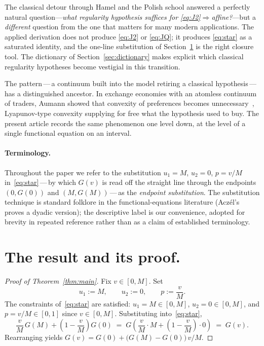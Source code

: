 \documentclass{article}
\theoremstyle{plain}
\theoremstyle{definition}
\begin{document}
The classical detour through Hamel and the Polish school answered a
perfectly natural question---\emph{what regularity hypothesis suffices
for \eqref{eq:J2}$\Rightarrow$affine?}---but a \emph{different}
question from the one that matters for many modern applications. The
applied derivation does not produce \eqref{eq:J2} or \eqref{eq:JQ};
it produces \eqref{eq:star} as a saturated identity, and the one-line
substitution of Section~\ref{sec:proof} is the right closure tool. The
dictionary of Section~\ref{sec:dictionary} makes explicit which classical
regularity hypotheses become vestigial in this transition.

The pattern\,---\,a continuum built into the model retiring a
classical hypothesis\,---\,has a distinguished ancestor. In exchange
economies with an atomless continuum of traders, Aumann showed that
convexity of preferences becomes unnecessary~\cite{Aumann1964},
Lyapunov-type convexity supplying for free what the hypothesis used to
buy. The present article records the same phenomenon one level down, at
the level of a single functional equation on an interval.

\paragraph{Terminology.}
Throughout the paper we refer to the substitution $u_1=M$, $u_2=0$,
$p=v/M$ in~\eqref{eq:star}\,---\,by which $G(v)$ is read off the straight
line through the endpoints $(0,G(0))$ and $(M,G(M))$\,---\,as the
\emph{endpoint substitution}. The substitution technique is standard
folklore in the functional-equations literature (Acz\'el's
\cite[\S2.1.4]{Aczel1966} proves a dyadic version); the descriptive
label is our convenience, adopted for brevity in repeated reference
rather than as a claim of established terminology.

\section{The result and its proof.}
\label{sec:proof}

\begin{proof}[Proof of Theorem~\ref{thm:main}]
Fix $v\in[0,M]$. Set
\[
u_1 := M, \qquad u_2 := 0, \qquad p := \frac{v}{M}.
\]
The constraints of~\eqref{eq:star} are satisfied: $u_1=M\in[0,M]$,
$u_2=0\in[0,M]$, and $p=v/M\in[0,1]$ since $v\in[0,M]$.
Substituting into~\eqref{eq:star},
\[
\frac{v}{M}\,G(M)+\left(1-\frac{v}{M}\right)G(0)
\;=\;
G\!\left(\frac{v}{M}\cdot M+\left(1-\frac{v}{M}\right)\cdot 0\right)
\;=\; G(v).
\]
Rearranging yields $G(v)=G(0)+\bigl(G(M)-G(0)\bigr)\,v/M$.
\end{proof}
\end{document}
